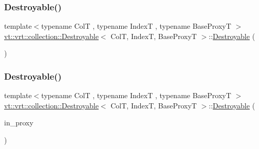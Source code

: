 \mbox{\label{structvt_1_1vrt_1_1collection_1_1_destroyable_a9e0023a2c3b0f17119410635ff438879}} 
\subsubsection{\texorpdfstring{Destroyable()}{Destroyable()}\hspace{0.1cm}{\footnotesize\ttfamily [3/4]}}
{\footnotesize\ttfamily template$<$typename ColT , typename IndexT , typename Base\+ProxyT $>$ \\
\hyperlink{structvt_1_1vrt_1_1collection_1_1_destroyable}{vt\+::vrt\+::collection\+::\+Destroyable}$<$ ColT, IndexT, Base\+ProxyT $>$\+::\hyperlink{structvt_1_1vrt_1_1collection_1_1_destroyable}{Destroyable} (\begin{DoxyParamCaption}\item[{\hyperlink{structvt_1_1vrt_1_1collection_1_1_destroyable}{Destroyable}$<$ ColT, IndexT, Base\+ProxyT $>$ \&\&}]{ }\end{DoxyParamCaption})\hspace{0.3cm}{\ttfamily [default]}}

\mbox{\label{structvt_1_1vrt_1_1collection_1_1_destroyable_aeedab2a596b9ec0741928245aa098757}} 
\subsubsection{\texorpdfstring{Destroyable()}{Destroyable()}\hspace{0.1cm}{\footnotesize\ttfamily [4/4]}}
{\footnotesize\ttfamily template$<$typename ColT , typename IndexT , typename Base\+ProxyT $>$ \\
\hyperlink{structvt_1_1vrt_1_1collection_1_1_destroyable}{vt\+::vrt\+::collection\+::\+Destroyable}$<$ ColT, IndexT, Base\+ProxyT $>$\+::\hyperlink{structvt_1_1vrt_1_1collection_1_1_destroyable}{Destroyable} (\begin{DoxyParamCaption}\item[{\hyperlink{namespacevt_a1b417dd5d684f045bb58a0ede70045ac}{Virtual\+Proxy\+Type} const}]{in\+\_\+proxy }\end{DoxyParamCaption})\hspace{0.3cm}{\ttfamily [explicit]}}



